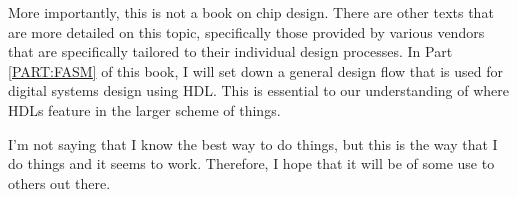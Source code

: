 More importantly, this is not a book on chip design.
There are other texts that are more detailed on this topic, specifically those provided by various vendors that are specifically tailored to their individual design processes.
In Part \ref{PART:FASM} of this book, I will set down a general design flow that is used for digital systems design using HDL.
This is essential to our understanding of where HDLs feature in the larger scheme of things.


I'm not saying that I know the best way to do things, but this is the way that I do things and it seems to work.
Therefore, 
I hope that it will be of some use to others out there.
